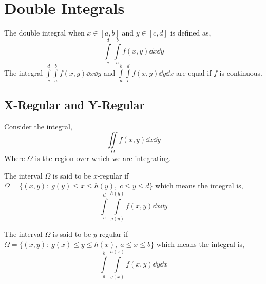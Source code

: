 \section{Double Integrals}
The double integral when $x\in[a,b]$ and $y\in[c,d]$ is defined as,
\[\int\limits_{c}^d\int\limits_a^b f(x,y)\dd{x}\dd{y}\]
The integral $\int\limits_{c}^d\int\limits_a^b f(x,y)\dd{x}\dd{y}$ and $\int\limits_{a}^b\int\limits_c^d f(x,y)\dd{y}\dd{x}$ are equal if $f$ is continuous.
\subsection{X-Regular and Y-Regular}
Consider the integral,
\[\iint\limits_\Omega f(x,y)\dd{x}\dd{y}\]
Where $\Omega$ is the region over which we are integrating.

The interval $\Omega$ is said to be $x$-regular if $\Omega=\{(x,y): \; g(y)\leq x \leq h(y), \; c\leq y\leq d\}$ which means the integral is,
\[\int\limits_c^d\int\limits_{g(y)}^{h(y)}f(x,y)\dd{x}\dd{y}\]

The interval $\Omega$ is said to be $y$-regular if $\Omega=\{(x,y): \; g(x)\leq y \leq h(x), \; a\leq x\leq b\}$ which means the integral is,
\[\int\limits_a^b\int\limits_{g(x)}^{h(x)}f(x,y)\dd{y}\dd{x}\]

